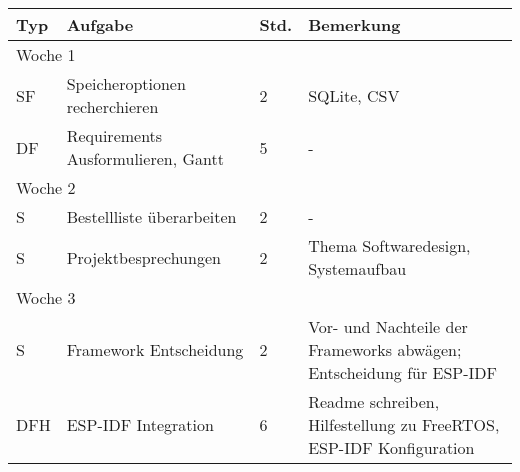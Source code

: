 \vspace{1em}
\begin{table}[!hp]
    \begin{center}
        \begin{tabular}{|p{0.8cm}|p{6cm}|p{0.8cm}|p{8cm}|} \hline
            \textbf{Typ} & \textbf{Aufgabe}                                                     & \textbf{Std.} & \textbf{Bemerkung}                                                               \\ \hline
            \multicolumn{4}{|l|}{Woche 1}                                                                                                                                                          \\ \hline
            SF           & Speicheroptionen recherchieren                                       & 2             & SQLite, CSV                                                                      \\
            DF           & Requirements Ausformulieren, Gantt                                   & 5             & -                                                                                \\ \hline
            \multicolumn{4}{|l|}{Woche 2}                                                                                                                                                          \\ \hline
            S            & Bestellliste überarbeiten                                            & 2             & -                                                                                \\
            S            & Projektbesprechungen                                                 & 2             & Thema Softwaredesign, Systemaufbau                                               \\ \hline
            \multicolumn{4}{|l|}{Woche 3}                                                                                                                                                          \\ \hline
            S            & Framework Entscheidung                                               & 2             & Vor- und Nachteile der Frameworks abwägen; Entscheidung für ESP-IDF              \\
            DFH          & ESP-IDF Integration                                                  & 6             & Readme schreiben, Hilfestellung zu FreeRTOS, ESP-IDF Konfiguration               \\ \hline

\end{tabular}
\end{center}
\end{table}
